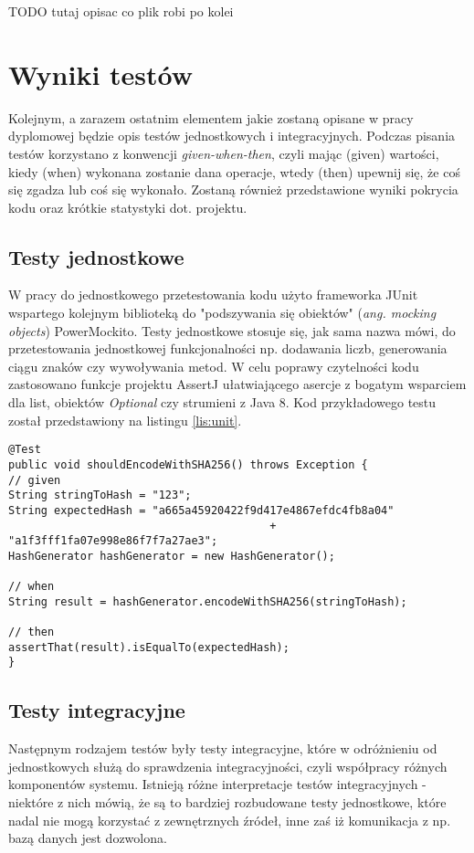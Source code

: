 TODO tutaj opisac co plik robi po kolei

\section{Wyniki testów}
Kolejnym, a zarazem ostatnim elementem jakie zostaną opisane w pracy dyplomowej będzie opis testów jednostkowych i integracyjnych. Podczas pisania testów korzystano z konwencji \textit{given-when-then}, czyli mając (given) wartości, kiedy (when) wykonana zostanie dana operacje, wtedy (then) upewnij się, że coś się zgadza lub coś się wykonało. Zostaną również przedstawione wyniki pokrycia kodu oraz krótkie statystyki dot. projektu.

\subsection{Testy jednostkowe}
W pracy do jednostkowego przetestowania kodu użyto frameworka JUnit wspartego kolejnym biblioteką do "podszywania się obiektów" (\textit{ang. mocking objects}) PowerMockito. Testy jednostkowe stosuje się, jak sama nazwa mówi, do przetestowania jednostkowej funkcjonalności np. dodawania liczb, generowania ciągu znaków czy wywoływania metod. W celu poprawy czytelności kodu zastosowano funkcje projektu AssertJ ułatwiającego asercje z bogatym wsparciem dla list, obiektów \textit{Optional} czy strumieni z Java 8. Kod przykładowego testu został przedstawiony na listingu \ref{lis:unit}.

\begin{lstlisting}[caption={Kod przykładowego testu jednostkowego}, label=lis:unit, numbers=none]
@Test
public void shouldEncodeWithSHA256() throws Exception {
// given
String stringToHash = "123";
String expectedHash = "a665a45920422f9d417e4867efdc4fb8a04"
										+ "a1f3fff1fa07e998e86f7f7a27ae3";
HashGenerator hashGenerator = new HashGenerator();

// when
String result = hashGenerator.encodeWithSHA256(stringToHash);

// then
assertThat(result).isEqualTo(expectedHash);
}\end{lstlisting}

\subsection{Testy integracyjne}
Następnym rodzajem testów były testy integracyjne, które w odróżnieniu od jednostkowych służą do sprawdzenia integracyjności, czyli współpracy różnych komponentów systemu. Istnieją różne interpretacje testów integracyjnych - niektóre z nich mówią, że są to bardziej rozbudowane testy jednostkowe, które nadal nie mogą korzystać z zewnętrznych źródeł, inne zaś iż komunikacja z np. bazą danych jest dozwolona. 

